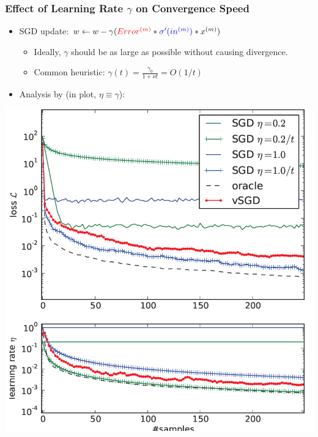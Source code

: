\documentclass{beamer}
\newcommand{\bi}{\begin{itemize}}
\newcommand{\ei}{\end{itemize}}
\begin{document}
\begin{frame}
\frametitle{Effect of Learning Rate $\gamma$ on Convergence Speed}
\bi
\item SGD update: $w \leftarrow w - \gamma({\color{red} Error^{(m)}} * {\color{blue} \sigma'(in^{(m)})} * x^{(m)})$
\bi
	\item Ideally, $\gamma$ should be as large as possible without causing divergence.
	\item Common heuristic: $\gamma(t) = \frac{\gamma_0}{1+\nu t} = O(1/t)$ 
\ei
\item Analysis by \cite{schaul13learningrate} (in plot, $\eta \equiv \gamma$):
\ei
\centerline{\includegraphics[scale=0.23]{figs/schaul13learningrate}}
\end{frame}
\end{document}
